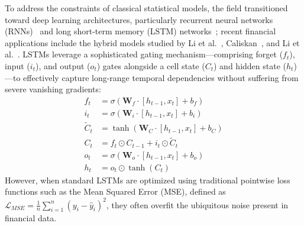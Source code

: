 To address the constraints of classical statistical models, the field transitioned toward deep learning architectures, particularly recurrent neural networks (RNNs)~\citep{elman1990finding} and long short-term memory (LSTM) networks~\citep{hochreiter1997lstm}; recent financial applications include the hybrid models studied by Li et al.~\citep{li2025ceemdan}, Caliskan~\citep{caliskan2025}, and Li et al.~\citep{SGP-LSTM1}. LSTMs leverage a sophisticated gating mechanism—comprising forget ($f_t$), input ($i_t$), and output ($o_t$) gates alongside a cell state ($C_t$) and hidden state ($h_t$)—to effectively capture long-range temporal dependencies without suffering from severe vanishing gradients:
\begin{align}
f_t &= \sigma(\mathbf{W}_f \cdot[h_{t-1}, x_t] + b_f) \\
i_t &= \sigma(\mathbf{W}_i \cdot [h_{t-1}, x_t] + b_i) \\
\tilde{C}_t &= \tanh(\mathbf{W}_C \cdot[h_{t-1}, x_t] + b_C) \\
C_t &= f_t \odot C_{t-1} + i_t \odot \tilde{C}_t \\
o_t &= \sigma(\mathbf{W}_o \cdot [h_{t-1}, x_t] + b_o) \\
h_t &= o_t \odot \tanh(C_t)
\end{align}
However, when standard LSTMs are optimized using traditional pointwise loss functions such as the Mean Squared Error (MSE), defined as $\mathcal{L}_{MSE} = \frac{1}{n} \sum_{i=1}^n (y_i - \hat{y}_i)^2$, they often overfit the ubiquitous noise present in financial data.

